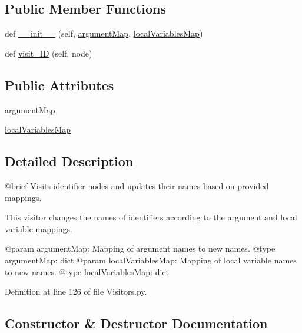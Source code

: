 \subsection*{Public Member Functions}
\begin{DoxyCompactItemize}
\item 
def \hyperlink{classVisitors_1_1IdVisitor_a649fc0ef07aae1d9fc3a510d3fe85c7f}{\+\_\+\+\_\+init\+\_\+\+\_\+} (self, \hyperlink{classVisitors_1_1IdVisitor_a976941a4c7ae422cebf58ddfd2e8b479}{argument\+Map}, \hyperlink{classVisitors_1_1IdVisitor_ad7cca8103c884420bac50cbb68183848}{local\+Variables\+Map})
\item 
def \hyperlink{classVisitors_1_1IdVisitor_a876b22ca4502c2197e9881ebf8fb6288}{visit\+\_\+\+ID} (self, node)
\end{DoxyCompactItemize}
\subsection*{Public Attributes}
\begin{DoxyCompactItemize}
\item 
\hyperlink{classVisitors_1_1IdVisitor_a976941a4c7ae422cebf58ddfd2e8b479}{argument\+Map}
\item 
\hyperlink{classVisitors_1_1IdVisitor_ad7cca8103c884420bac50cbb68183848}{local\+Variables\+Map}
\end{DoxyCompactItemize}


\subsection{Detailed Description}
\begin{DoxyVerb}@brief Visits identifier nodes and updates their names based on provided mappings.

This visitor changes the names of identifiers according to the argument and local variable mappings.

@param argumentMap: Mapping of argument names to new names.
@type argumentMap: dict
@param localVariablesMap: Mapping of local variable names to new names.
@type localVariablesMap: dict
\end{DoxyVerb}
 

Definition at line 126 of file Visitors.\+py.



\subsection{Constructor \& Destructor Documentation}
\mbox{\label{classVisitors_1_1IdVisitor_a649fc0ef07aae1d9fc3a510d3fe85c7f}} 
